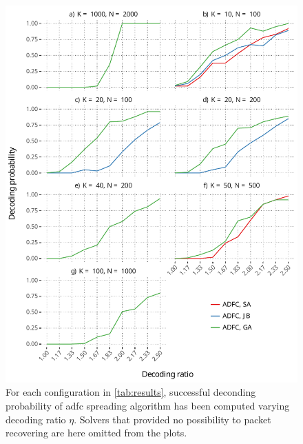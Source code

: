 \documentclass[12pt,journal,draftclsnofoot,onecolumn]{IEEEtran}
\begin{document}
\begin{figure}[htp]
	\includegraphics[]{figures/eta_vs_prob_adfc_only.pdf}
	\caption{For each configuration in \autoref{tab:results}, successful deconding probability of \gls{adfc} spreading algorithm has been computed varying decoding ratio $\eta$. Solvers that provided no possibility to packet recovering are here omitted from the plots.}
	\label{fig:eta_vs_prob_adfc_only}
\end{figure}
\end{document}
